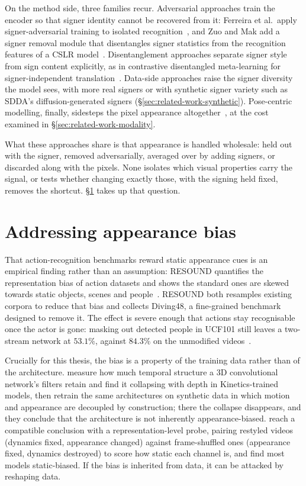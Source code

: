 On the method side, three families recur. Adversarial approaches train
the encoder so that signer identity cannot be recovered from it:
Ferreira et al.\ apply signer-adversarial training to isolated
recognition~\cite{Ferreira2021}, and Zuo and Mak add a signer removal
module that disentangles signer statistics from the recognition features
of a CSLR model~\cite{zuoImprovingContinuousSign2024}. Disentanglement
approaches separate signer style from sign content explicitly, as in
contrastive disentangled meta-learning for signer-independent
translation~\cite{jinContrastiveDisentangledMetaLearning2021}. Data-side
approaches raise the signer diversity the model sees, with more real
signers or with synthetic signer variety such as SDDA's
diffusion-generated signers (\S\ref{sec:related-work-synthetic}).
Pose-centric modelling, finally, sidesteps the pixel appearance
altogether~\cite{kratimenosIndependentSignLanguage2020,
tranRegionAwarePoseModeling2025}, at the cost examined in
\S\ref{sec:related-work-modality}.

What these approaches share is that appearance is handled wholesale: held
out with the signer, removed adversarially, averaged over by adding
signers, or discarded along with the pixels. None isolates which visual
properties carry the signal, or tests whether changing exactly those,
with the signing held fixed, removes the shortcut.
\S\ref{sec:related-appearance-bias} takes up that question.
\section{Addressing appearance bias}
\label{sec:related-appearance-bias}
That action-recognition benchmarks reward static appearance cues is an
empirical finding rather than an assumption: RESOUND quantifies the
representation bias of action datasets and shows the standard ones are
skewed towards static objects, scenes and
people~\cite{liRESOUNDActionRecognition2018}. RESOUND both resamples
existing corpora to reduce that bias and collects Diving48, a
fine-grained benchmark designed to remove it. The effect is severe enough
that actions stay recognisable once the actor is gone: masking out
detected people in UCF101 still leaves a two-stream network at $53.1\%$,
against $84.3\%$ on the unmodified
videos~\cite{heHumanActionRecognition2016}.

Crucially for this thesis, the bias is a property of the training data
rather than of the architecture.
\citet{byvshevAre3DConvolutional2022a} measure how much temporal
structure a 3D convolutional network's filters retain and find it
collapsing with depth in Kinetics-trained models, then retrain the same
architectures on synthetic data in which motion and appearance are
decoupled by construction; there the collapse disappears, and they
conclude that the architecture is not inherently appearance-biased.
\citet{kowalQuantifyingLearningStatic2025} reach a compatible conclusion
with a representation-level probe, pairing restyled videos (dynamics
fixed, appearance changed) against frame-shuffled ones (appearance fixed,
dynamics destroyed) to score how static each channel is, and find most
models static-biased. If the bias is inherited from data, it can be
attacked by reshaping data.

